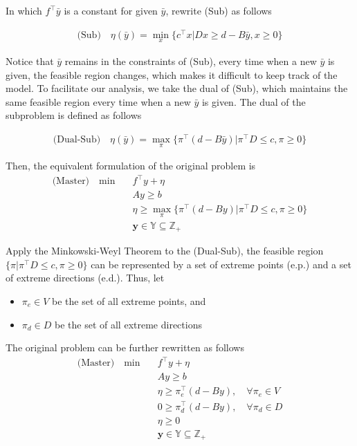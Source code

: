         In which $f^\top \bar{y}$ is a constant for given $\bar{y}$, rewrite (Sub) as follows

        \begin{align*}
            \text{(Sub)} \quad \eta(\bar{y}) = \min_x \{c^\top x | D x \ge d - B \bar{y}, x \ge 0\}
        \end{align*}

        Notice that $\bar{y}$ remains in the constraints of (Sub), every time when a new $\bar{y}$ is given, the feasible region changes, which makes it difficult to keep track of the model. To facilitate our analysis, we take the dual of (Sub), which maintains the same feasible region every time when a new $\bar{y}$ is given. The dual of the subproblem is defined as follows

        \begin{align*}
            \text{(Dual-Sub)} \quad \eta(\bar{y}) = \max_{\pi} \{\pi^\top (d - B\bar{y})| \pi^\top D \le c, \pi \ge 0\}
        \end{align*}

        Then, the equivalent formulation of the original problem is
        \begin{align*}
            \text{(Master)} \quad \min \quad & f^\top y + \eta\\
            & Ay \ge b\\
            & \eta \ge \max_\pi \{\pi^\top (d - By) | \pi^\top D \le c, \pi \ge 0\}\\
            & \mathbf{y} \in \mathbb{Y} \subseteq \mathbb{Z}_+
        \end{align*}

        Apply the Minkowski-Weyl Theorem to the (Dual-Sub), the feasible region $\{\pi|\pi^\top D \le c, \pi \ge 0\}$ can be represented by a set of extreme points (e.p.) and a set of extreme directions (e.d.). Thus, let

        \begin{itemize}
            \item $\pi_e \in V$ be the set of all extreme points, and 
            \item $\pi_d \in D$ be the set of all extreme directions
        \end{itemize}

        The original problem can be further rewritten as follows
        \begin{align*}
            \text{(Master)} \quad \min \quad & f^\top y + \eta\\
            & Ay \ge b\\
            & \eta \ge \pi_e^\top (d - By), \quad \forall \pi_e \in V\\
            & 0 \ge \pi_d^\top (d - By), \quad \forall \pi_d \in D\\
            & \eta \ge 0\\
            & \mathbf{y} \in \mathbb{Y} \subseteq \mathbb{Z}_+
        \end{align*}

